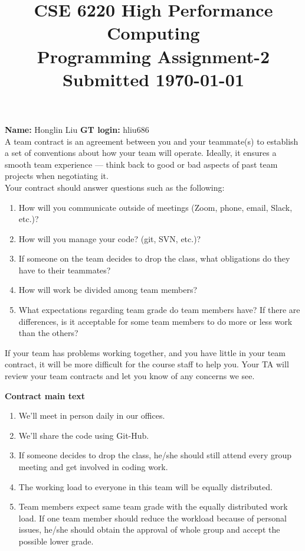 \documentclass[11pt]{article}
\begin{document}
\title{\large\bf \vspace*{-0.3in}CSE 6220 High Performance Computing\\
Programming Assignment-2 \\Submitted \today}
\author{}
\date{}
\maketitle
\vspace*{-0.8in}
{\bf Name:} Honglin Liu \hfill{{\bf GT login:} hliu686}\\

A team contract is an agreement between you and your teammate(s) to establish a set of conventions about how your team will operate. 
Ideally, it ensures a smooth team experience — think back to good or bad aspects of past team projects when negotiating it.\\

Your contract should answer questions such as the following:
\begin{enumerate}
	\item How will you communicate outside of meetings (Zoom, phone, email, Slack, etc.)?
	\item How will you manage your code? (git, SVN, etc.)?
	\item If someone on the team decides to drop the class, what obligations do they have to their teammates?
	\item How will work be divided among team members?
	\item What expectations regarding team grade do team members have? If there are differences, is it acceptable for some team members to do more or less work than the others?
\end{enumerate}

If your team has problems working together, and you have little in your team contract, it will be more difficult for the course staff to help you. Your TA will review your team contracts and let you know of any concerns we see.


\newpage
\textbf{Contract main text}
\begin{enumerate}
	\item We'll meet in person daily in our offices.
	\item We'll share the code using Git-Hub.
	\item If someone decides to drop the class, he/she should still attend every group meeting and get involved in coding work.
 	\item The working load to everyone in this team will be equally distributed.
 	\item Team members expect same team grade with the equally distributed work load. If one team member should reduce the workload because of personal issues, he/she should obtain the approval of whole group and accept the possible lower grade.

\end{enumerate}
\end{document}

